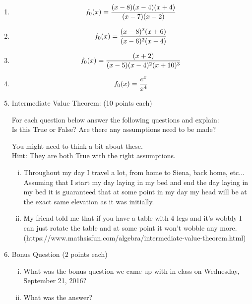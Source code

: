 \documentclass[11pt]{article}
\begin{document}
	\begin{enumerate}
		\item  $$f_{\number\value{enumi}}(x) = \frac{(x-8)(x-4)(x+4)}{(x-7)(x-2)}$$
		\newpage
		\item  $$f_{\number\value{enumi}}(x) = \frac{(x-8)^2(x+6)}{(x-6)^2(x-4)}$$
		\newpage
		\item  $$f_{\number\value{enumi}}(x) = \frac{(x+2)}{(x-5)(x-4)^2(x+10)^3}$$
		\newpage
		\item  $$f_{\number\value{enumi}}(x) = \frac{e^x}{x^4}$$
		\newpage
		\item Intermediate Value Theorem: (10 points each)\par
		For each question below answer the following questions and explain:\\
		Is this True or False?  Are there any assumptions need to be made?\par
		You might need to think a bit about these.\\
		Hint: They are both True with the right assumptions.
		\begin{enumerate}[i)]
			\item  Throughout my day I travel a lot, from home to Siena, back home, etc...  Assuming that I start my day laying in my bed and end the day laying in my bed it is guaranteed that at some point in my day my head will be at the exact same elevation as it was initially.
			\vspace{2.5in}
			\item  My friend told me that if you have a table with 4 legs and it's wobbly I can just rotate the table and at some point it won't wobble any more.\\
			(https://www.mathsisfun.com/algebra/intermediate-value-theorem.html)
		\end{enumerate}
		\newpage
		\item Bonus Question (2 points each)
		\begin{enumerate}[i)]
			\item  What was the bonus question we came up with in class on Wednesday, September 21, 2016?
			\vspace{2in}
			\item  What was the answer?
		\end{enumerate}
	\end{enumerate}
	
\end{document}
